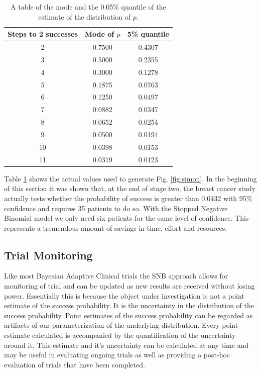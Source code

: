 \documentclass[12pt]{article}         %
\begin{document}
\begin{table}
\begin{center}
\begin{tabular}{|c|c|c|} \hline
{\bf Steps to 2 successes} & {\bf Mode of $p$} & {\bf 5\% quantile} \\ \hline
2 & 0.7500  & 0.4307 \\ \hline
3 & 0.5000  & 0.2355 \\ \hline
4 & 0.3000  & 0.1278 \\ \hline
5 & 0.1875  & 0.0763 \\ \hline
6 & 0.1250  & 0.0497 \\ \hline
7 & 0.0882  & 0.0347 \\ \hline
8 & 0.0652  & 0.0254 \\ \hline
9 & 0.0500  & 0.0194 \\ \hline
10 & 0.0398 & 0.0153 \\ \hline
11 & 0.0319 & 0.0123 \\ \hline
\end{tabular} 
\end{center}
\caption{
A table of the mode and the 0.05\% quantile of the estimate of the distribution of $p$.
}
\label{tab:simon}
\end{table} 

Table \ref{tab:simon} shows the actual values used to generate Fig. \ref{fig:simon}. In the beginning of this section it was shown that, at the end of stage two, the breast cancer study actually tests whether the probability of success is greater than 0.0432 with 95\% confidence and requires 35 patients to do so. With the Stopped Negative Binomial model we only need six patients for the same level of confidence. This represents a tremendous amount of savings in time, effort and resources.

\subsection{Trial Monitoring}

Like most Bayesian Adaptive Clinical trials the SNB approach allows for monitoring of trial and can be updated as new results are received without losing power. Essentially this is because the object under investigation is not a point estimate of the success probability. It is the uncertainty in the distribution of the success probability. Point estimates of the success probability can be regarded as artifacts of our parameterization of the underlying distribution. Every point estimate calculated is accompanied by the quantification of the uncertainty around it. This estimate and it's uncertainty can be calculated at any time and may be useful in evaluating ongoing trials as well as providing a post-hoc evaluation of trials that have been completed.
\end{document}
